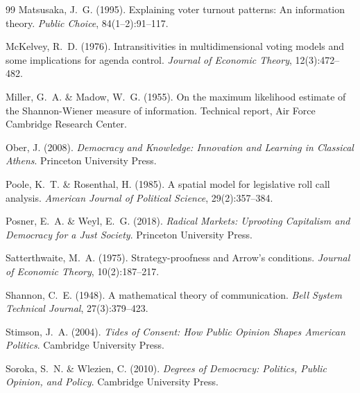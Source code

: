 \documentclass[twocolumn,10pt]{article}
\begin{document}
\begin{thebibliography}{99}
Matsusaka, J.~G. (1995).
\newblock Explaining voter turnout patterns: An information theory.
\newblock \emph{Public Choice}, 84(1--2):91--117.

McKelvey, R.~D. (1976).
\newblock Intransitivities in multidimensional voting models and some implications for agenda control.
\newblock \emph{Journal of Economic Theory}, 12(3):472--482.

Miller, G.~A. \& Madow, W.~G. (1955).
\newblock On the maximum likelihood estimate of the {S}hannon-{W}iener measure of information.
\newblock Technical report, Air Force Cambridge Research Center.

Ober, J. (2008).
\newblock \emph{Democracy and Knowledge: Innovation and Learning in Classical Athens}.
\newblock Princeton University Press.

Poole, K.~T. \& Rosenthal, H. (1985).
\newblock A spatial model for legislative roll call analysis.
\newblock \emph{American Journal of Political Science}, 29(2):357--384.

Posner, E.~A. \& Weyl, E.~G. (2018).
\newblock \emph{Radical Markets: Uprooting Capitalism and Democracy for a Just Society}.
\newblock Princeton University Press.

Satterthwaite, M.~A. (1975).
\newblock Strategy-proofness and {A}rrow's conditions.
\newblock \emph{Journal of Economic Theory}, 10(2):187--217.

Shannon, C.~E. (1948).
\newblock A mathematical theory of communication.
\newblock \emph{Bell System Technical Journal}, 27(3):379--423.

Stimson, J.~A. (2004).
\newblock \emph{Tides of Consent: How Public Opinion Shapes American Politics}.
\newblock Cambridge University Press.

Soroka, S.~N. \& Wlezien, C. (2010).
\newblock \emph{Degrees of Democracy: Politics, Public Opinion, and Policy}.
\newblock Cambridge University Press.

\end{thebibliography}
\end{document}
